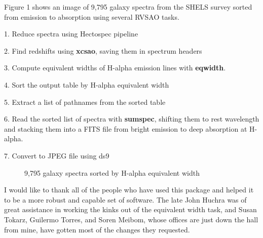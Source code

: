 Figure 1 shows an image of 9,795 galaxy spectra from the SHELS survey \citep{shels_2005} sorted from emission to absorption using several RVSAO tasks.

1.  Reduce spectra using Hectospec pipeline

2.  Find redshifts using \textbf{xcsao}, saving them in spectrum headers

3.  Compute equivalent widths of H-alpha emission lines with \textbf{eqwidth}.

4. Sort the output table by H-alpha equivalent width

5. Extract a list of pathnames from the sorted table

6. Read the sorted list of spectra with \textbf{sumspec}, shifting them to rest wavelength and stacking them into a FITS file from bright emission to deep absorption at H-alpha.

7. Convert to JPEG file using ds9

\begin{figure}[!ht]
\caption{9,795 galaxy spectra sorted by H-alpha equivalent width}
\end{figure}

\acknowledgements
I would like to thank all of the people who have used this package and helped it to be a more robust and capable set of software.  The late John Huchra was of great assistance in working the kinks out of the equivalent width task, and Susan Tokarz, Guilermo Torres, and Soren Meibom, whose offices are just down the hall from mine, have gotten most of the changes they requested.


